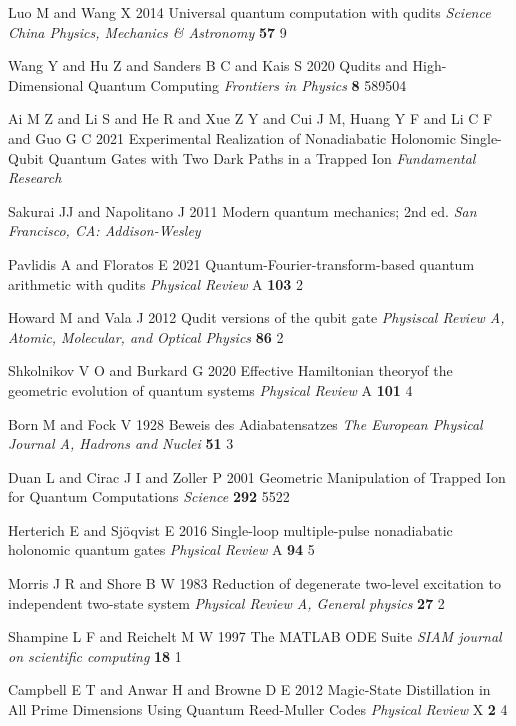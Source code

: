 \begin{enumerate}[label={[\arabic*]}]
\item Luo M and Wang X 2014 Universal quantum computation with qudits \textit{Science China Physics, Mechanics \& Astronomy} \textbf{57} 9


\item Wang Y and Hu Z and Sanders B C and Kais S 2020 Qudits and High-Dimensional Quantum Computing \textit{Frontiers in Physics} \textbf{8} 589504

\item Ai M Z and Li S and He R and Xue Z Y and Cui J M, Huang Y F and Li C F and Guo G C 2021 Experimental Realization of
Nonadiabatic Holonomic Single-Qubit Quantum Gates with Two Dark Paths in
a Trapped Ion \textit{Fundamental Research}

\item Sakurai JJ and Napolitano J 2011 Modern quantum mechanics; 2nd ed. \textit{San Francisco, CA: Addison-Wesley}

\item Pavlidis A and Floratos E 2021 Quantum-Fourier-transform-based quantum arithmetic with qudits \textit{Physical Review} A \textbf{103} 2

\item Howard M and Vala J 2012 Qudit versions of the qubit gate \textit{Physiscal Review A, Atomic, Molecular, and Optical Physics} \textbf{86} 2 

\item Shkolnikov V O and Burkard G 2020 Effective Hamiltonian theoryof the geometric evolution of quantum systems \textit{Physical Review} A \textbf{101} 4

\item Born M and Fock V 1928 Beweis des Adiabatensatzes \textit{The European Physical Journal A, Hadrons and Nuclei} \textbf{51} 3

\item Duan L and Cirac J I and Zoller P 2001 Geometric Manipulation of Trapped Ion for Quantum Computations \textit{Science} \textbf{292} 5522

\item Herterich E and Sjöqvist E 2016 Single-loop multiple-pulse nonadiabatic holonomic quantum gates \textit{Physical Review} A \textbf{94} 5

\item Morris J R and Shore B W 1983 Reduction of degenerate two-level excitation to independent two-state system \textit{Physical Review A, General physics} \textbf{27} 2

\item Shampine L F and Reichelt M W 1997 The MATLAB ODE Suite \textit{SIAM journal on scientific computing} \textbf{18} 1

\item Campbell E T and Anwar H and Browne D E 2012 Magic-State Distillation in All Prime Dimensions Using Quantum Reed-Muller Codes \textit{Physical Review} X \textbf{2} 4




\end{enumerate}